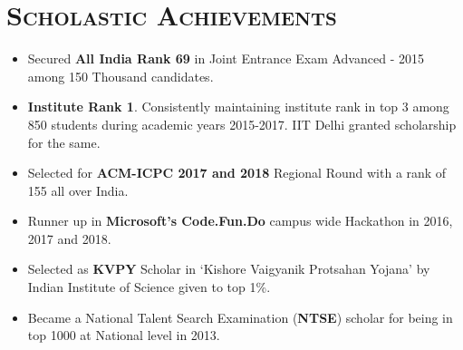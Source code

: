 \documentclass{article}
\newcommand{\tmpsection}[1]{}
\let\tmpsection=\section
\renewcommand{\section}[1]{\tmpsection*{\textsc{#1}}}
\begin{document}
\section{Scholastic Achievements}
\begin{itemize}
    \setlength\itemsep{0.0em}
    \item Secured \textbf{All India Rank 69} in Joint Entrance Exam Advanced - 2015 among 150 Thousand candidates.
    \item \textbf{Institute Rank 1}. Consistently maintaining institute rank in top 3 among 850 students during academic years 2015-2017. IIT Delhi granted scholarship for the same.
    \item Selected for \textbf{ACM-ICPC 2017 and 2018} Regional Round with a rank of 155 all over India.
    \item Runner up in \textbf{Microsoft's Code.Fun.Do} campus wide Hackathon in 2016, 2017 and 2018.
    \item Selected as \textbf{KVPY} Scholar in `Kishore Vaigyanik Protsahan Yojana' by Indian Institute of Science given to top 1\%.
    \item Became a National Talent Search Examination (\textbf{NTSE}) scholar for being in top 1000 at National level in 2013.
\end{itemize}
\end{document}
